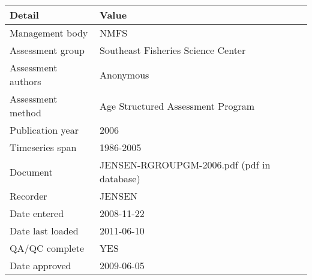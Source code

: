 \begin{table}[htb]
\centering
\begin{tabular}{lp{7cm}}
\toprule
Detail & Value \\
\midrule
Management body    & NMFS                                       \\
Assessment group   & Southeast Fisheries Science Center         \\
Assessment authors & Anonymous                                  \\
Assessment method  & Age Structured Assessment Program          \\
Publication year   & 2006                                       \\
Timeseries span    & 1986-2005                                  \\
Document           & JENSEN-RGROUPGM-2006.pdf (pdf in database) \\
Recorder           & JENSEN                                     \\
Date entered       & 2008-11-22                                 \\
Date last loaded   & 2011-06-10                                 \\
QA/QC complete     & YES                                        \\
Date approved      & 2009-06-05                                 \\
\bottomrule
\end{tabular}
\label{tab:assessdet}
\end{table}
